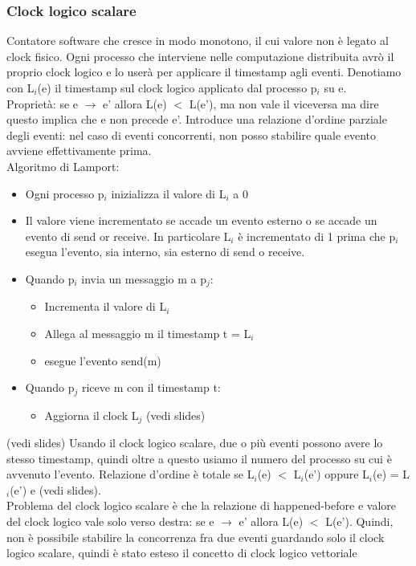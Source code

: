 \documentclass[16px]{article}
\begin{document}
\subsubsection{Clock logico scalare}
Contatore software che cresce in modo monotono, il cui valore non è legato al clock fisico. Ogni processo che interviene nelle computazione distribuita avrò il proprio clock logico e lo userà per applicare il timestamp agli eventi. Denotiamo con L$_i$(e) il timestamp sul clock logico applicato dal processo p$_i$ su e.\\ Proprietà: se e $\rightarrow$ e' allora L(e) $<$ L(e'), ma non vale il viceversa ma dire questo implica che e non precede e'. Introduce una relazione d'ordine parziale degli eventi: nel caso di eventi concorrenti, non posso stabilire quale evento avviene effettivamente prima.\\ Algoritmo di Lamport:
\begin{itemize}
\item Ogni processo p$_i$ inizializza il valore di L$_i$ a 0
\item Il valore viene incrementato se accade un evento esterno o se accade un evento di send or receive. In particolare L$_i$ è incrementato di 1 prima che p$_i$ esegua l'evento, sia interno, sia esterno di send o receive.
\item Quando p$_i$ invia un messaggio m a p$_j$:
\begin{itemize}
\item Incrementa il valore di L$_i$
\item Allega al messaggio m il timestamp t = L$_i$
\item esegue l'evento send(m)
\end{itemize}
\item Quando p$_j$ riceve m con il timestamp t:
\begin{itemize}
\item Aggiorna il clock L$_j$ (vedi slides)
\end{itemize}
\end{itemize}
(vedi slides)
Usando il clock logico scalare, due o più eventi possono avere lo stesso timestamp, quindi oltre a questo usiamo il numero del processo su cui è avvenuto l'evento. Relazione d'ordine è totale se L$_i$(e) $<$ L$_i$(e') oppure L$_i$(e) = L$_i$(e') e (vedi slides).\\ Problema del clock logico scalare è che la relazione di happened-before e valore del clock logico vale solo verso destra: se e $\rightarrow$ e' allora L(e) $<$ L(e'). Quindi, non è possibile stabilire la concorrenza fra due eventi guardando solo il clock logico scalare, quindi è stato esteso il concetto di clock logico vettoriale
\end{document}
